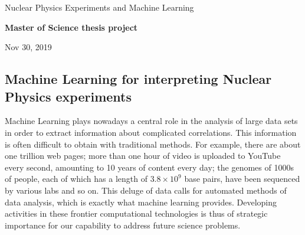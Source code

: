 \documentclass[%
oneside,                 %
final,                   %
10pt]{article}
\begin{document}

\newcommand{\exercisesection}[1]{\subsection*{#1}}






\thispagestyle{empty}

\begin{center}
{\LARGE\bf
\begin{spacing}{1.25}
Nuclear Physics Experiments and  Machine Learning
\end{spacing}
}
\end{center}


\begin{center}
{\bf Master of Science thesis project${}^{}$} \\ [0mm]
\end{center}

\begin{center}
\end{center}
    

\begin{center}
Nov 30, 2019
\end{center}

\vspace{1cm}


\subsection{Machine Learning for interpreting Nuclear Physics experiments}


Machine Learning plays nowadays a central role
in the analysis of large data sets in order to extract information
about complicated correlations. This information is often difficult to
obtain with traditional methods. For example, there are about one
trillion web pages; more than one hour of video is uploaded to YouTube
every second, amounting to 10 years of content every day; the genomes
of 1000s of people, each of which has a length of $3.8\times 10^9$
base pairs, have been sequenced by various labs and so on. This deluge
of data calls for automated methods of data analysis, which is exactly
what machine learning provides.  Developing activities in these
frontier computational technologies is thus of strategic importance
for our capability to address future science problems.
\end{document}
